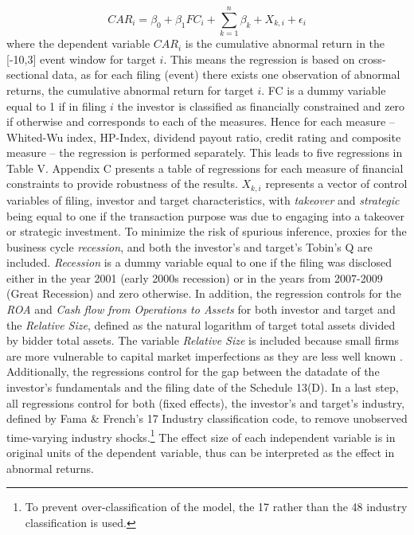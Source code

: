 \documentclass[12pt]{article}
\begin{document}
\begin{equation}
	CAR_{i}=\beta_{0}+\beta_{1}FC_{i}+\sum_{k=1}^{n}\beta_{k}+X_{k,i}+\epsilon_{i}
\end{equation}
where the dependent variable $CAR_{i}$ is the cumulative abnormal return in the [-10,3] event window for target $i$. This means the regression is based on cross-sectional data, as for each filing (event) there exists one observation of abnormal returns, the cumulative abnormal return for target $i$. FC is a dummy variable equal to 1 if in filing $i$ the investor is classified as financially constrained and zero if otherwise and corresponds to each of the measures. Hence for each measure -- Whited-Wu index, HP-Index, dividend payout ratio, credit rating and composite measure -- the regression is performed separately. This leads to five regressions in Table V. Appendix C presents a table of regressions for each measure of financial constraints to provide robustness of the results. $X_{k,i}$ represents a vector of control variables of filing, investor and target characteristics, with \emph{takeover} and \emph{strategic} being equal to one if the transaction purpose was due to engaging into a takeover or strategic investment. To minimize the risk of spurious inference, proxies for the business cycle \emph{recession}, and both the investor's and target's Tobin's Q are included. \emph{Recession} is a dummy variable equal to one if the filing was disclosed either in the year 2001 (early 2000s recession) or in the years from 2007-2009 (Great Recession) and zero otherwise. In addition, the regression controls for the \emph{ROA} and \emph{Cash flow from Operations to Assets} for both investor and target and the \emph{Relative Size}, defined as the natural logarithm of target total assets divided by bidder total assets. The variable \emph{Relative Size} is included because small firms are more vulnerable to capital market imperfections  as they are less well known \citep[p.2004]{Almeida2004}. Additionally, the regressions control for the gap between the datadate of the investor's fundamentals and the filing date of the Schedule 13(D). In a last step, all regressions control for both (fixed effects), the investor's and target's industry, defined by Fama \& French's 17 Industry classification code, to remove unobserved time-varying industry shocks.\footnote{To prevent over-classification of the model, the 17 rather than the 48 industry classification is used.} The effect size of each independent variable is in original units of the dependent variable, thus can be interpreted as the effect in abnormal returns.\par
\end{document}
